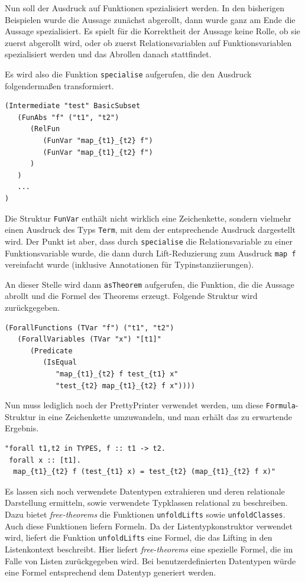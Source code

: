 Nun soll der Ausdruck auf Funktionen spezialisiert werden. In den bisherigen Beispielen wurde die Aussage zunächst abgerollt, dann
wurde ganz am Ende die Aussage spezialisiert. Es spielt für die Korrektheit der Aussage keine Rolle, ob sie zuerst abgerollt wird, oder ob
zuerst Relationsvariablen auf Funktionsvariablen spezialisiert werden und das Abrollen danach stattfindet.

Es wird also die Funktion \texttt{specialise} aufgerufen, die den Ausdruck folgendermaßen transformiert.

\begin{verbatim}
(Intermediate "test" BasicSubset 
   (FunAbs "f" ("t1", "t2")
      (RelFun
         (FunVar "map_{t1}_{t2} f")
         (FunVar "map_{t1}_{t2} f")
      )
   )
   ...
)
\end{verbatim}

Die Struktur \texttt{FunVar} enthält nicht wirklich eine Zeichenkette, sondern vielmehr einen Ausdruck des Typs \texttt{Term},
mit dem der entsprechende Ausdruck dargestellt wird. Der Punkt ist aber, dass durch \texttt{specialise} die Relationsvariable
zu einer Funktionsvariable wurde, die dann durch Lift-Reduzierung zum Ausdruck \texttt{map f} vereinfacht wurde (inklusive
Annotationen für Typinstanziierungen).

An dieser Stelle wird dann \texttt{asTheorem} aufgerufen, die Funktion, die die Aussage abrollt und die Formel des Theorems
erzeugt. Folgende Struktur wird zurückgegeben.

\begin{verbatim}
(ForallFunctions (TVar "f") ("t1", "t2")
   (ForallVariables (TVar "x") "[t1]"
      (Predicate
         (IsEqual
            "map_{t1}_{t2} f test_{t1} x"
            "test_{t2} map_{t1}_{t2} f x"))))
\end{verbatim}

Nun muss lediglich noch der PrettyPrinter verwendet werden, um diese \texttt{Formula}-Struktur in eine Zeichenkette umzuwandeln,
und man erhält das zu erwartende Ergebnis.

\begin{verbatim}
"forall t1,t2 in TYPES, f :: t1 -> t2.
 forall x :: [t1].
  map_{t1}_{t2} f (test_{t1} x) = test_{t2} (map_{t1}_{t2} f x)"
\end{verbatim}

Es lassen sich noch verwendete Datentypen extrahieren und deren relationale Darstellung ermitteln, sowie verwendete Typklassen
relational zu beschreiben. Dazu bietet \textit{free-theorems} die Funktionen \texttt{unfoldLifts} sowie \texttt{unfoldClasses}.
Auch diese Funktionen liefern Formeln. %
Da der Listentypkonstruktor verwendet wird, liefert die Funktion \texttt{unfoldLifts} eine Formel, die das Lifting in den Listenkontext
beschreibt. Hier liefert \textit{free-theorems} eine spezielle Formel, die im Falle von Listen zurückgegeben wird. Bei benutzerdefinierten
Datentypen würde eine Formel entsprechend dem Datentyp generiert werden.

